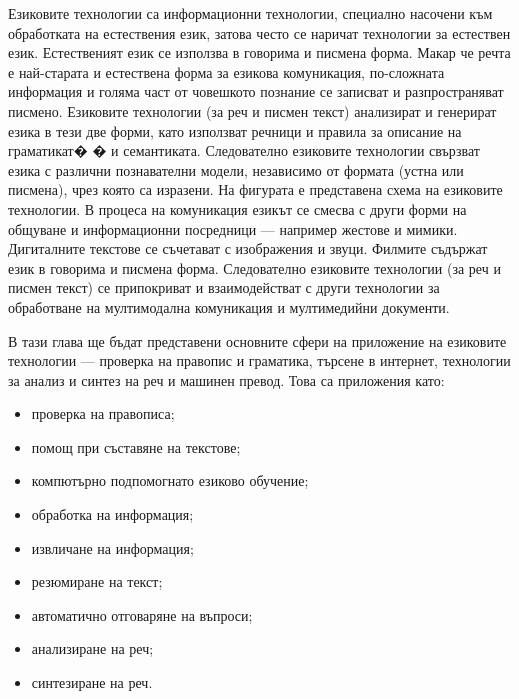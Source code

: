 

\begin{multicols}{2}

Езиковите технологии са информационни технологии, специално насочени към обработката на естествения език, затова често се наричат технологии за естествен език. Естественият език се използва в говорима и писмена форма. Макар че речта е най-старата и естествена форма за езикова комуникация, по-сложната информация и голяма част от човешкото познание се записват и разпространяват писмено. Езиковите технологии (за реч и писмен текст) анализират и генерират езика в тези две форми, като използват речници и правила за описание на граматикат�
 � и семантиката. Следователно езиковите технологии свързват езика с различни познавателни модели, независимо от формата (устна или писмена), чрез която са изразени.
На фигурата е представена схема на езиковите технологии. В процеса на комуникация езикът се смесва с други форми на общуване и информационни посредници — например жестове и мимики. Дигиталните текстове се съчетават с изображения и звуци. Филмите съдържат език в говорима и писмена форма. Следователно езиковите технологии (за реч и писмен текст) се припокриват и взаимодействат с други технологии за  обработване на мултимодална комуникация и мултимедийни документи. 

В тази глава  ще бъдат представени основните сфери на приложение на езиковите технологии — проверка на правопис и граматика, търсене в интернет, технологии за анализ и синтез на реч и машинен превод. Това са приложения като: 
\begin{itemize}
\item проверка на правописа;
\item помощ при съставяне на текстове;
\item компютърно подпомогнато езиково обучение;
\item обработка на информация;
\item извличане на информация;
\item резюмиране на текст;
\item автоматично отговаряне на въпроси;
\item анализиране на реч;
\item синтезиране на реч.
\end{itemize}


\end{multicols}
